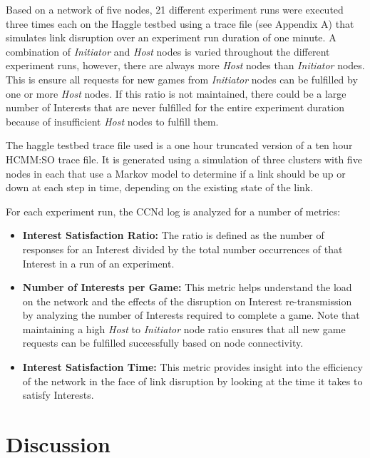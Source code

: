 \documentclass[a4paper,12pt]{report}      %
\begin{document}
Based on a network of five nodes, 21 different experiment runs were executed three times each on the Haggle testbed
using a trace file (see Appendix A) that simulates link disruption over an experiment run duration of one minute. A
combination of \emph{Initiator} and \emph{Host} nodes is varied throughout the different experiment runs, however, there are always
more \emph{Host} nodes than \emph{Initiator} nodes. This is ensure all requests for new games from \emph{Initiator} nodes can be fulfilled
by one or more \emph{Host} nodes. If this ratio is not maintained, there could be a large number of Interests that are never
fulfilled for the entire experiment duration because of insufficient \emph{Host} nodes to fulfill them. 

The haggle testbed trace file used is a one hour truncated version of a ten hour HCMM:SO trace file. It is generated using a simulation of three clusters with five nodes in each that use a Markov model to determine if a link should be up or down at each step in time, depending on the existing state of the link\cite{haggletrc}.

\noindent For each experiment run, the CCNd log is analyzed for a number of metrics:

\begin{itemize}
\item \textbf{Interest Satisfaction Ratio:} The ratio is defined as the number of responses for an Interest divided
 by the total number occurrences of that Interest in a run of an experiment.

\item \textbf{Number of Interests per Game:} This metric helps understand the load on the network and the
effects of the disruption on Interest re-transmission by analyzing the number of Interests
required to complete a game. Note that maintaining a high \emph{Host} to \emph{Initiator} node ratio ensures
that all new game requests can be fulfilled successfully based on node connectivity.

\item \textbf{Interest Satisfaction Time:} This metric provides insight into the efficiency of the network in the
face of link disruption by looking at the time it takes to satisfy Interests.
\end{itemize}

\section{Discussion}
\end{document}
